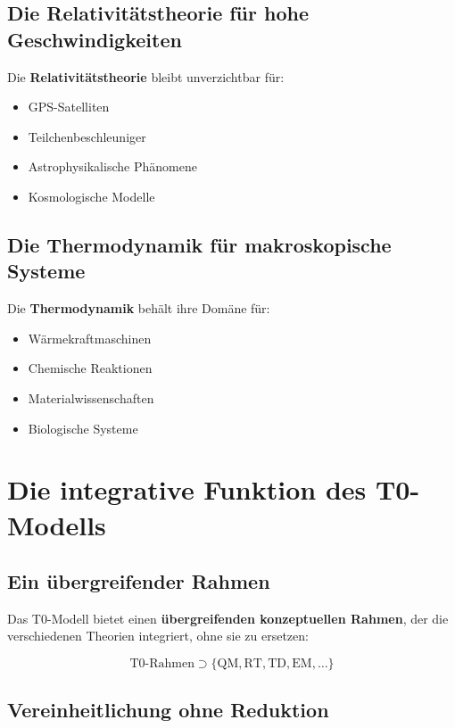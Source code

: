 \documentclass[12pt,a4paper]{report}
\begin{document}
	\subsection{Die Relativitätstheorie für hohe Geschwindigkeiten}
	
	Die \textbf{Relativitätstheorie} bleibt unverzichtbar für:
	
	\begin{itemize}
		\item GPS-Satelliten
		\item Teilchenbeschleuniger
		\item Astrophysikalische Phänomene
		\item Kosmologische Modelle
	\end{itemize}
	
	\subsection{Die Thermodynamik für makroskopische Systeme}
	
	Die \textbf{Thermodynamik} behält ihre Domäne für:
	
	\begin{itemize}
		\item Wärmekraftmaschinen
		\item Chemische Reaktionen
		\item Materialwissenschaften
		\item Biologische Systeme
	\end{itemize}
	
	\section{Die integrative Funktion des T0-Modells}
	
	\subsection{Ein übergreifender Rahmen}
	
	Das T0-Modell bietet einen \textbf{übergreifenden konzeptuellen Rahmen}, der die verschiedenen Theorien integriert, ohne sie zu ersetzen:
	
	\begin{equation}
		\text{T0-Rahmen} \supset \{\text{QM}, \text{RT}, \text{TD}, \text{EM}, \ldots\}
	\end{equation}
	
	\subsection{Vereinheitlichung ohne Reduktion}
	
\end{document}
